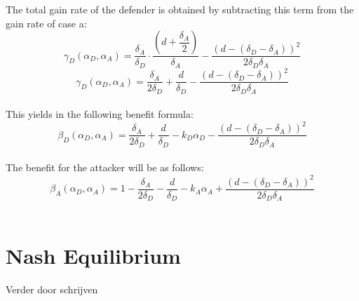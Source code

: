 \documentclass[master=cws, masteroption=vs,english]{kulemt}
\begin{document}
\begin{abstract*}
The total gain  rate of the defender is obtained by subtracting this term from the gain rate of case a:
 \begin{equation}\label{first}
\gamma_{D}(\alpha_{D},\alpha_{A}) = \dfrac{\delta_{A}}{\delta_{D}} \cdot \dfrac{(d+\dfrac{\delta_{A}}{2})}{\delta_{A}} - \dfrac{(d - (\delta_{D} - \delta_{A}))^{2}}{2 \delta_{D} \delta_{A}}
\end{equation}
\begin{equation}\label{first}
\gamma_{D}(\alpha_{D},\alpha_{A}) = \dfrac{\delta_{A}}{2\delta_{D}} + \dfrac{d}{\delta_{D}} - \dfrac{(d - (\delta_{D} - \delta_{A}))^{2}}{2 \delta_{D} \delta_{A}}
\end{equation}\\
This yields in the following benefit formula:
\begin{equation}\label{first}
\beta_{D}(\alpha_{D},\alpha_{A}) = \dfrac{\delta_{A}}{2\delta_{D}} + \dfrac{d}{\delta_{D}} - k_{D} \alpha_{D} - \dfrac{(d - (\delta_{D} - \delta_{A}))^{2}}{2 \delta_{D} \delta_{A}}
\end{equation}\\
 
The benefit for the attacker will be as follows:
\begin{equation}\label{first}
\beta_{A}(\alpha_{D},\alpha_{A}) = 1 -\dfrac{\delta_{A}}{2\delta_{D}} - \dfrac{d}{\delta_{D}} - k_{A} \alpha_{A} + \dfrac{(d - (\delta_{D} - \delta_{A}))^{2}}{2 \delta_{D} \delta_{A}}
\end{equation}\\


\section{Nash Equilibrium}
Verder door schrijven


\end{abstract*}
\end{document}
